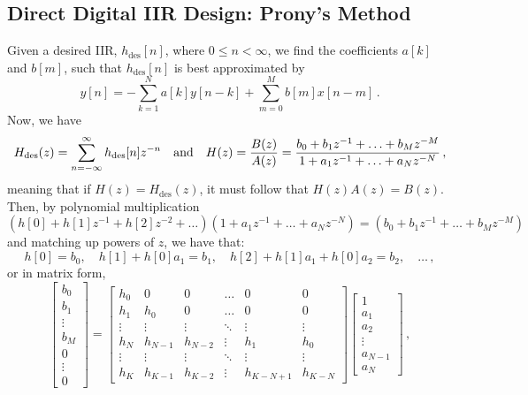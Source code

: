 \subsection{Direct Digital IIR Design: Prony's Method}
%
Given a desired IIR, $h_\mathrm{des}[n]$, where $0\leq n < \infty$, we
find the coefficients $a[k]$ and $b[m]$, such that $h_\mathrm{des}[n]$
is best approximated by 
%
\begin{displaymath}
  y[n] = - \sum_{k=1}^N a[k]y[n-k] + \sum_{m=0}^M b[m]x[n-m] \,.
\end{displaymath}
%
Now, we have
%
\begin{displaymath}
  H_\mathrm{des}(z) = \sum_{n=-\infty}^\infty h_\mathrm{des}[n]z^{-n}
  \quad\mathrm{and}\quad
  H(z) = \frac{B(z)}{A(z)}
  = \frac{b_0 + b_1z^{-1} + \hdots + b_Mz^{-M}}{1 + a_1z^{-1} + \hdots + a_Nz^{-N}} \,,
\end{displaymath}
%
meaning that if $H(z) = H_\mathrm{des}(z)$, it must follow that
$H(z)A(z) = B(z)$. Then, by polynomial multiplication
%
\begin{displaymath}
  \left(h[0] + h[1]z^{-1} + h[2]z^{-2} + \hdots\right)
  \left(1 + a_1z^{-1} + \hdots + a_Nz^{-N}\right)
  =
  \left(b_0 + b_1z^{-1} + \hdots + b_Mz^{-M}\right)
\end{displaymath}
%
and matching up powers of $z$, we have that:
%
\begin{displaymath}
  h[0] = b_0, \quad
  h[1] + h[0]a_1 = b_1, \quad
  h[2] + h[1]a_1 + h[0]a_2 = b_2, \quad \hdots \,,
\end{displaymath}
%
or in matrix form,
%
\begin{displaymath}
  \left[\begin{array}{c} b_0 \\ b_1 \\ \vdots \\ b_M \\ 0 \\ \vdots \\ 0 \end{array}\right]
  =
  \left[\begin{array}{cccccc}
      h_0 & 0 & 0 & \hdots & 0 & 0 \\
      h_1 & h_0 & 0 & \hdots & 0 & 0 \\
      \vdots & \vdots & \vdots & \ddots & \vdots & \vdots \\
      h_N & h_{N-1} & h_{N-2} & \vdots & h_1 & h_0 \\
      \vdots & \vdots & \vdots & \ddots & \vdots & \vdots \\
      h_K & h_{K-1} & h_{K-2} & \vdots & h_{K-N+1} & h_{K-N}
    \end{array}\right]
  \left[\begin{array}{c} 1 \\ a_1 \\ a_2 \\ \vdots \\ a_{N-1} \\a_N \end{array}\right] \,,
\end{displaymath}
